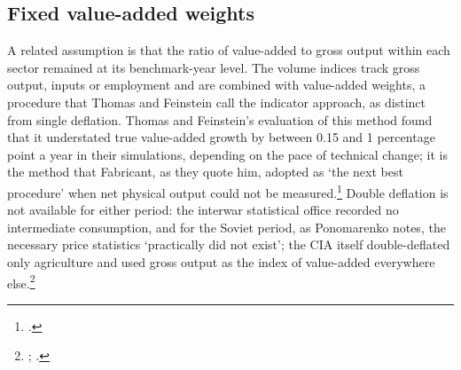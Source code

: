 \subsection{Fixed value-added weights}

A related assumption is that the ratio of value-added to gross output within each sector remained at its benchmark-year level. The volume indices track gross output, inputs or employment and are combined with value-added weights, a procedure that Thomas and Feinstein call the indicator approach, as distinct from single deflation. Thomas and Feinstein's evaluation of this method found that it understated true value-added growth by between 0.15 and 1 percentage point a year in their simulations, depending on the pace of technical change; it is the method that Fabricant, as they quote him, adopted as `the next best procedure' when net physical output could not be measured.\footnote{\autocite[427, 443--4]{thomasfeinstein2003}.} Double deflation is not available for either period: the interwar statistical office recorded no intermediate consumption, and for the Soviet period, as Ponomarenko notes, the necessary price statistics `practically did not exist'; the CIA itself double-deflated only agriculture and used gross output as the index of value-added everywhere else.\footnote{\autocite[18--19]{ponomarenko2002}; \autocite[45]{cia1982a}.}

